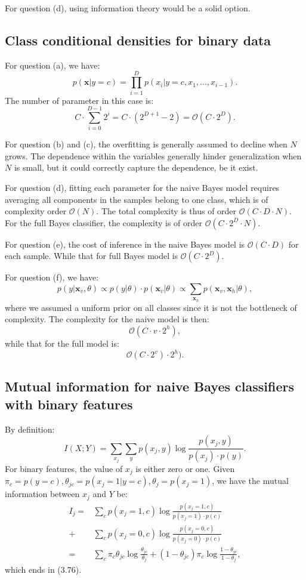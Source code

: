 \documentclass[UTF8]{ctexart}
\begin{document}
For question (d), using information theory would be a solid option.

\subsection{Class conditional densities for binary data}
For question (a), we have:
$$p(\textbf{x}|y=c)=\prod_{i=1}^{D}p(x_{i}|y=c,x_{1},...,x_{i-1}).$$
The number of parameter in this case is:
$$C\cdot \sum_{i=0}^{D-1}2^{i}=C\cdot(2^{D+1}-2) = \mathcal{O}(C\cdot 2^{D}).$$

For question (b) and (c), the overfitting is generally assumed to decline when $N$ grows.
The dependence within the variables generally hinder generalization when $N$ is small, but it could correctly capture the dependence, be it exist.

For question (d), fitting each parameter for the naive Bayes model requires averaging all components in the samples belong to one class, which is of complexity order $\mathcal{O}(N)$. The total complexity is thus of order $\mathcal{O}(C\cdot D\cdot N)$.
For the full Bayes classifier, the complexity is of order $\mathcal{O}(C\cdot 2^{D}\cdot N)$.

For question (e), the cost of inference in the naive Bayes model is $\mathcal{O}(C\cdot D)$ for each sample.
While that for full Bayes model is $\mathcal{O}(C\cdot 2^{D})$.

For question (f), we have:
$$p(y|\textbf{x}_{v},\theta)\propto p(y|\theta)\cdot p(\textbf{x}_{v}|\theta)\propto\sum_{\textbf{x}_{h}}p(\textbf{x}_{v},\textbf{x}_{h}|\theta),$$
where we assumed a uniform prior on all classes since it is not the bottleneck of complexity.
The complexity for the naive model is then:
$$\mathcal{O}(C\cdot v\cdot 2^{h}),$$
while that for the full model is:
$$\mathcal{O}(C\cdot 2^{v})\cdot 2^{h}).$$


\subsection{Mutual information for naive Bayes classifiers with binary features}
By definition:
$$I(X;Y)=\sum_{x_{j}}\sum_{y}p(x_{j},y)\log \frac{p(x_{j},y)}{p(x_{j})\cdot p(y)}.$$
For binary features, the value of $x_{j}$ is either zero or one.
Given $\pi_{c}=p(y=c),\theta_{jc}=p(x_{j}=1|y=c),\theta_{j}=p(x_{j}=1)$, we have the mutual information between $x_{j}$ and $Y$ be:
\begin{align}
I_{j}=&\sum_{c}p(x_{j}=1,c)\log \frac{p(x_{j}=1,c)}{p(x_{j}=1)\cdot p(c)}\nonumber \\
 +& \sum_{c}p(x_{j}=0,c)\log \frac{p(x_{j}=0,c)}{p(x_{j}=0)\cdot p(c)} \nonumber \\
=&\sum_{c}\pi_{c}\theta_{jc} \log \frac{\theta_{jc}}{\theta_{j}} + (1-\theta_{jc})\pi_{c} \log \frac{1-\theta_{jc}}{1-\theta_{j}},\nonumber
\end{align}
which ends in (3.76).
\end{document}
